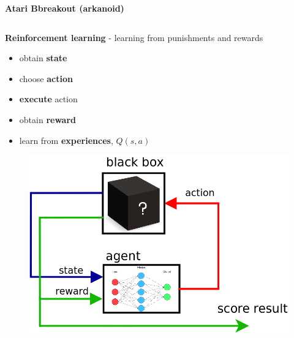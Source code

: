 \documentclass[xcolor=dvipsnames]{beamer}
\begin{document}
\begin{frame}{\bf Atari Bbreakout (arkanoid)}
\begin{columns}
\begin{column}{0.5\textwidth}
    \end{column}
\end{columns}

\end{frame}

\begin{frame}{\bf Reinforcement learning}
- learning from punishments and rewards

\begin{itemize}
  \item obtain {\bf state}
  \item choose {\bf action}
  \item {\bf execute} action
  \item obtain {\bf reward}
  \item learn from {\bf experiences}, $Q(s, a)$
\end{itemize}

  \begin{figure}
    \includegraphics[scale=0.3]{../../diagrams/rl_mechanism.png}
  \end{figure}

\end{frame}
\end{document}
